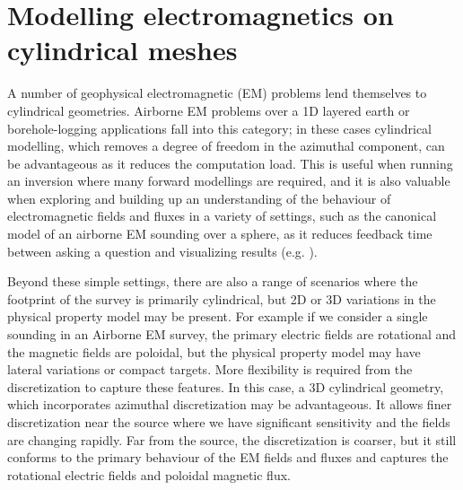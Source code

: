 
\chapter{Modelling electromagnetics on cylindrical meshes}
\label{ch:casing-software}

A number of geophysical electromagnetic (EM) problems lend themselves to cylindrical geometries. Airborne EM problems over a 1D layered earth or borehole-logging applications fall into this category; in these cases cylindrical modelling, which removes a degree of freedom in the azimuthal component, can be advantageous as it reduces the computation load. This is useful when running an inversion where many forward modellings are required, and it  is also valuable when exploring and building up an understanding of the behaviour of electromagnetic fields and fluxes in a variety of settings, such as the canonical model of an airborne EM sounding over a sphere, as it reduces feedback time between asking a question and visualizing results (e.g. \cite{Oldenburg2017}).

Beyond these simple settings, there are also a range of scenarios where the footprint of the survey is primarily cylindrical, but 2D or 3D variations in the physical property model may be present. For example if we consider a single sounding in an Airborne EM survey, the primary electric fields are rotational and the magnetic fields are poloidal, but the physical property model may have lateral variations or compact targets. More flexibility is required from the discretization to capture these features. In this case, a 3D cylindrical geometry, which incorporates azimuthal discretization may be advantageous. It allows finer discretization near the source where we have significant sensitivity and the fields are changing rapidly. Far from the source, the discretization is coarser, but it still conforms to the primary behaviour of the EM fields and fluxes and captures the rotational electric fields and poloidal magnetic flux.


